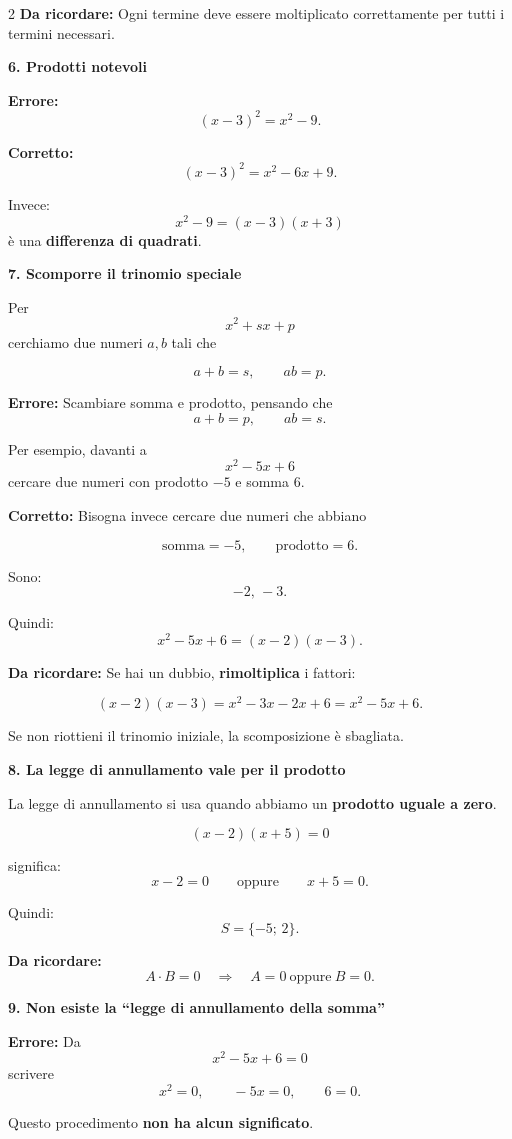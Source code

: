 \documentclass[9pt,a4paper]{extarticle}
\newcommand{\err}[1]{%
	{\color{errore}\textbf{Errore:}} #1
}
\newcommand{\corr}[1]{%
	{\color{corretto}\textbf{Corretto:}} #1
}
\newcommand{\regola}[1]{%
	{\color{titolo}\textbf{Da ricordare:}} #1
}
\newcommand{\voce}[1]{%
	\vspace{3pt}
	{\color{titolo}\textbf{#1}}\par
	\vspace{1pt}
}
\begin{document}
\begin{multicols}{2}
\regola{Ogni termine deve essere moltiplicato correttamente
per tutti i termini necessari.}

\voce{6. Prodotti notevoli}

\err{
\[
(x-3)^2=x^2-9.
\]
}

\corr{
\[
(x-3)^2=x^2-6x+9.
\]
}

Invece:
\[
x^2-9=(x-3)(x+3)
\]
è una \textbf{differenza di quadrati}.

\voce{7. Scomporre il trinomio speciale}

Per
\[
x^2+sx+p
\]
cerchiamo due numeri $a,b$ tali che

\[
a+b=s,
\qquad
ab=p.
\]

\err{Scambiare somma e prodotto, pensando che
\[
a+b=p,
\qquad
ab=s.
\]
}

Per esempio, davanti a
\[
x^2-5x+6
\]
cercare due numeri con prodotto $-5$ e somma $6$.

\corr{Bisogna invece cercare due numeri che abbiano}

\[
\text{somma}=-5,
\qquad
\text{prodotto}=6.
\]

Sono:
\[
-2,\,-3.
\]

Quindi:
\[
x^2-5x+6=(x-2)(x-3).
\]

\regola{Se hai un dubbio, \textbf{rimoltiplica} i fattori:}
\[
(x-2)(x-3)
=
x^2-3x-2x+6
=
x^2-5x+6.
\]

Se non riottieni il trinomio iniziale, la scomposizione è sbagliata.

\voce{8. La legge di annullamento vale per il prodotto}

La legge di annullamento si usa quando abbiamo un
\textbf{prodotto uguale a zero}.

\[
(x-2)(x+5)=0
\]

significa:
\[
x-2=0
\qquad\text{oppure}\qquad
x+5=0.
\]

Quindi:
\[
S=\{-5;\,2\}.
\]

\regola{
\[
A\cdot B=0
\quad\Longrightarrow\quad
A=0 \ \text{oppure}\ B=0.
\]
}

\voce{9. Non esiste la ``legge di annullamento della somma''}

\err{Da
\[
x^2-5x+6=0
\]
scrivere
\[
x^2=0,\qquad -5x=0,\qquad 6=0.
\]
}

Questo procedimento \textbf{non ha alcun significato}.


\end{multicols}
\end{document}
